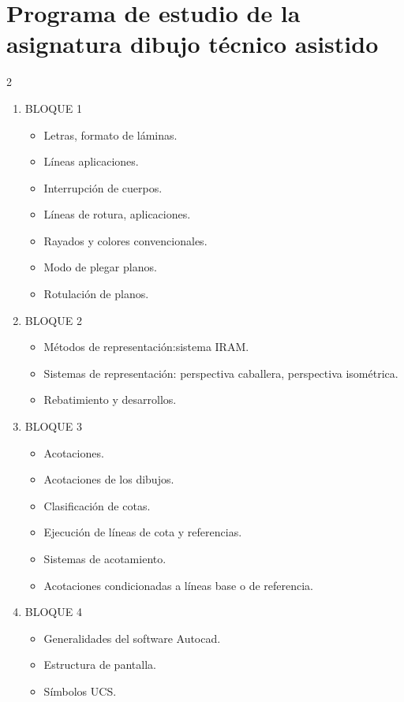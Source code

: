 \documentclass[../main]{subfiles}
\begin{document}
\section*{Programa de estudio de la asignatura dibujo técnico asistido}
\begin{multicols}{2}
  \begin{enumerate}
    \item BLOQUE 1
      \begin{itemize}
        \item Letras, formato de láminas.
        \item Líneas aplicaciones.
        \item Interrupción de cuerpos.
        \item Líneas de rotura, aplicaciones.
        \item Rayados y colores convencionales.
        \item Modo de plegar planos.
        \item Rotulación de planos.
      \end{itemize}
    \item BLOQUE 2
      \begin{itemize}
        \item Métodos de representación:sistema IRAM.\@
        \item Sistemas de representación: perspectiva caballera,
          perspectiva isométrica.
        \item Rebatimiento y desarrollos.
      \end{itemize}
    \item BLOQUE 3
      \begin{itemize}
        \item Acotaciones.
        \item Acotaciones de los dibujos.
        \item Clasificación de cotas.
        \item Ejecución de líneas de cota y referencias.
        \item Sistemas de acotamiento.
        \item Acotaciones condicionadas a líneas base o de referencia.
      \end{itemize}
    \item BLOQUE 4
      \begin{itemize}
        \item Generalidades del software Autocad.
        \item Estructura de pantalla.
        \item Símbolos UCS.\@

\end{itemize}
\end{enumerate}
\end{multicols}
\end{document}
